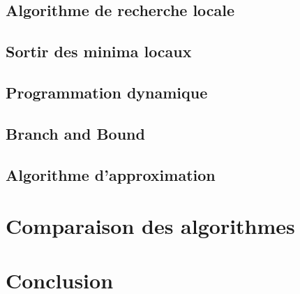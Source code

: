 \documentclass[11pt]{article}
\begin{document}
\subsection*{Algorithme de recherche locale}

\subsection*{Sortir des minima locaux}

\subsection*{Programmation dynamique}

\subsection*{Branch and Bound}

\subsection*{Algorithme d'approximation}

\section{Comparaison des algorithmes}
\section{Conclusion}
\end{document}
